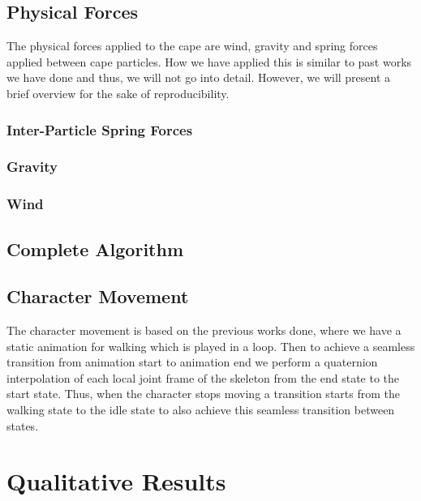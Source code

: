 \documentclass{article}
\begin{document}
\subsection{Physical Forces}

The physical forces applied to the cape are wind, gravity and spring forces applied between cape particles.
How we have applied this is similar to past works we have done and thus, we will not go into detail. However,
we will present a brief overview for the sake of reproducibility.

\subsubsection{Inter-Particle Spring Forces}

\subsubsection{Gravity}

\subsubsection{Wind}

\subsection{Complete Algorithm}

\subsection{Character Movement}

The character movement is based on the previous works done, where we have a static animation for walking which
is played in a loop. Then to achieve a seamless transition from animation start to animation end we perform a
quaternion interpolation of each local joint frame of the skeleton from the end state to the start state.
Thus, when the character stops moving a transition starts from the walking state to the idle state to also 
achieve this seamless transition between states.


\section{Qualitative Results} \label{sec:/results}
\end{document}
